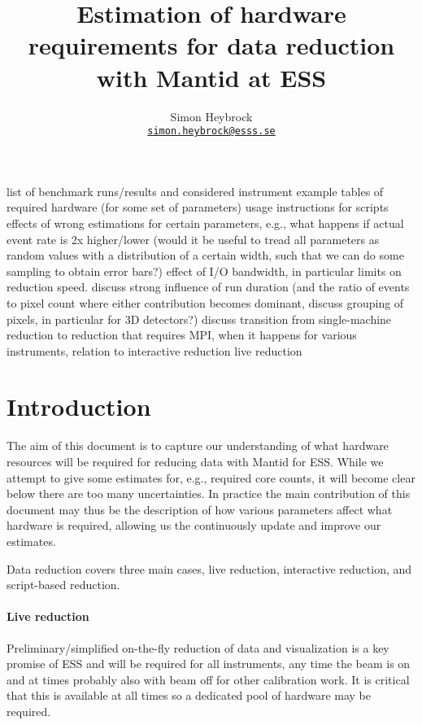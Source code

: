\documentclass[a4paper,english,numbers=noenddot,bibliography=totoc,chapterprefix=on,DIV=12]{scrartcl}
\begin{document}
\title{Estimation of hardware requirements for data reduction with Mantid at ESS}
\author{Simon Heybrock\\
    {\small\href{mailto:simon.heybrock@esss.se}{\nolinkurl{simon.heybrock@esss.se}}}}

\maketitle

\tableofcontents

list of benchmark runs/results and considered instrument
example tables of required hardware (for some set of parameters)
usage instructions for scripts
effects of wrong estimations for certain parameters, e.g., what happens if actual event rate is 2x higher/lower (would it be useful to tread all parameters as random values with a distribution of a certain width, such that we can do some sampling to obtain error bars?)
effect of I/O bandwidth, in particular limits on reduction speed.
discuss strong influence of run duration (and the ratio of events to pixel count where either contribution becomes dominant, discuss grouping of pixels, in particular for 3D detectors?)
discuss transition from single-machine reduction to reduction that requires MPI, when it happens for various instruments, relation to interactive reduction
live reduction

\section{Introduction}

The aim of this document is to capture our understanding of what hardware resources will be required for reducing data with Mantid for ESS.
While we attempt to give some estimates for, e.g., required core counts, it will become clear below there are too many uncertainties. In practice the main contribution of this document may thus be the description of how various parameters affect what hardware is required, allowing us the continuously update and improve our estimates.

Data reduction covers three main cases, live reduction, interactive reduction, and script-based reduction.

\paragraph{Live reduction}
Preliminary/simplified on-the-fly reduction of data and visualization is a key promise of ESS and will be required for all instruments, any time the beam is on and at times probably also with beam off for other calibration work.
It is critical that this is available at all times so a dedicated pool of hardware may be required.
\end{document}
